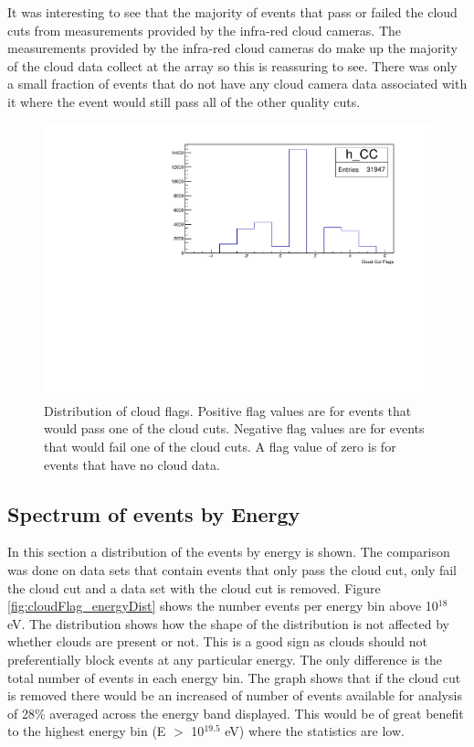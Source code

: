 It was interesting to see that the majority of events that pass or failed the cloud cuts from measurements provided by the infra-red cloud cameras. The measurements provided by the infra-red cloud cameras do make up the majority of the cloud data collect at the array so this is reassuring to see. There was only a small fraction of events that do not have any cloud camera data associated with it where the event would still pass all of the other quality cuts. 

\begin{figure}[!]
\centering
\includegraphics[width=\textwidth]{chapters/graphs/CloudFlags/hist_cloudFlags.pdf}
\caption{Distribution of cloud flags. Positive flag values are for events that would pass one of the cloud cuts. Negative flag values are for events that would fail one of the cloud cuts. A flag value of zero is for events that have no cloud data.}\label{fig:cloudFlag_dist}
\end{figure}


\subsection{Spectrum of events by Energy}

In this section a distribution of the events by energy is shown. The comparison was done on data sets that contain events that only pass the cloud cut, only fail the cloud cut and a data set with the cloud cut is removed. Figure \ref{fig:cloudFlag_energyDist} shows the number events per energy bin above 10$^{18}$ eV. The distribution shows how the shape of the distribution is not affected by whether clouds are present or not. This is a good sign as clouds should not preferentially block events at any particular energy. The only difference is the total number of events in each energy bin. The graph shows that if the cloud cut is removed there would be an increased of number of events available for analysis of 28\% averaged across the energy band displayed. This would be of great benefit to the highest energy bin (E $>$ 10$^{19.5}$ eV) where the statistics are low. 

